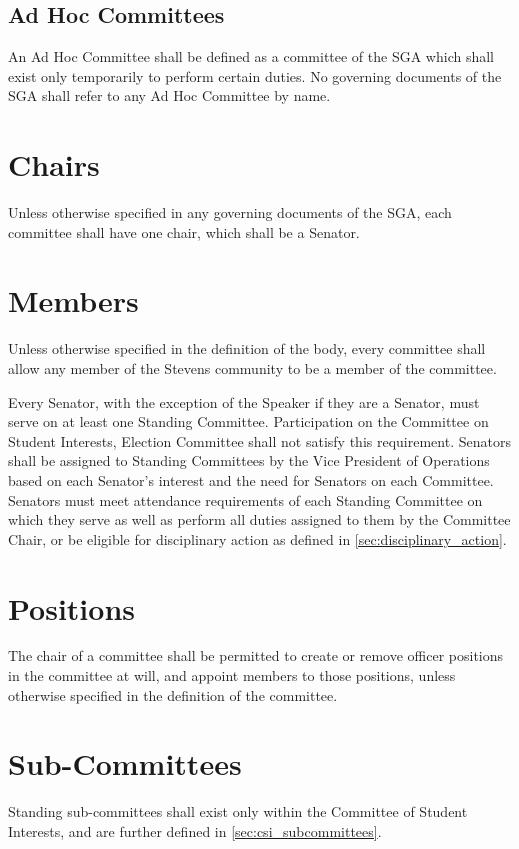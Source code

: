 \documentclass[12pt]{scrreprt}
\begin{document}
\subsection{Ad Hoc Committees}
An Ad Hoc Committee shall be defined as a committee of the SGA which shall exist only temporarily to perform certain duties. No governing documents of the SGA shall refer to any Ad Hoc Committee by name.

\section{Chairs}
Unless otherwise specified in any governing documents of the SGA, each committee shall have one chair, which shall be a Senator.

\section{Members}
Unless otherwise specified in the definition of the body, every committee 
shall allow any member of the Stevens community to be a member of the 
committee.

Every Senator, with the exception of the Speaker if they are a Senator, must serve on at least one Standing Committee. Participation on the Committee on Student Interests, Election Committee shall not satisfy this requirement. 
Senators shall be assigned to Standing Committees by the Vice President of Operations based on each Senator’s interest and the need for Senators on each Committee. Senators must meet attendance requirements of each Standing Committee on which they serve as well as perform all duties assigned to them by the Committee Chair, or be eligible for disciplinary action as defined in \ref{sec:disciplinary_action}.

\section{Positions}
The chair of a committee shall be permitted to create or remove officer 
positions in the committee at will, and appoint members to those positions, 
unless otherwise specified in the definition of the committee.

\section{Sub-Committees}
Standing sub-committees shall exist only within the Committee of Student 
Interests, and are further defined in \ref{sec:csi_subcommittees}.
\end{document}
